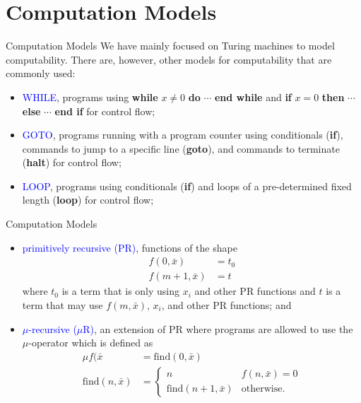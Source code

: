 \documentclass{beamer}
\theoremstyle{definition}
\def\b{\textcolor{blue}}
\begin{document}
\section{Computation Models}

\begin{frame}{Computation Models}
    We have mainly focused on Turing machines to model computability. There are, however, other models for computability that are commonly used:\pause
    \begin{itemize}
        \item \b{WHILE}, programs using \textbf{while} $x \neq 0$ \textbf{do} $\cdots$ \textbf{end while} and \textbf{if} $x = 0$ \textbf{then} $\cdots$ \textbf{else} $\cdots$ \textbf{end if} for control flow\pause;
        \item \b{GOTO}, programs running with a program counter using conditionals (\textbf{if}), commands to jump to a specific line (\textbf{goto}), and commands to terminate (\textbf{halt}) for control flow\pause;
        \item \b{LOOP}, programs using conditionals (\textbf{if}) and loops of a pre-determined fixed length (\textbf{loop}) for control flow;
    \end{itemize}
\end{frame}

\begin{frame}{Computation Models}
    \begin{itemize}
        \item \b{primitively recursive (PR)}, functions of the shape \begin{align*}
            f(0,\bar{x}) &= t_0 \\
            f(m+1,\bar{x}) &= t
        \end{align*} where $t_0$ is a term that is only using $x_i$ and other PR functions and $t$ is a term that may use $f(m,\bar{x})$, $x_i$, and other PR functions\pause; and
        \item \b{$\mu$-recursive ($\mu$R)}, an extension of PR where programs are allowed to use the $\mu$-operator which is defined as \begin{align*}
            \mu f(\bar{x} &= \text{find}(0,\bar{x}) \\
            \text{find}(n,\bar{x}) &= \begin{cases}
                n & f(n,\bar{x}) = 0 \\
                \text{find}(n+1,\bar{x}) & \text{otherwise}.
            \end{cases}
        \end{align*}
    \end{itemize}
\end{frame}
\end{document}

